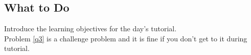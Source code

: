 \subsection*{What to Do}
	
Introduce the learning objectives for the day's tutorial. \\




Problem \ref{q3} is a challenge problem and it is fine if you don't get to it during tutorial.




%
	
	

	
	
